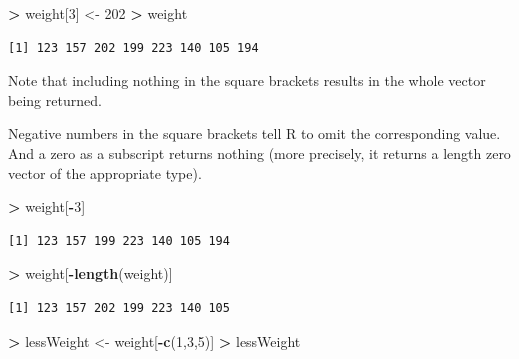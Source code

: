 \documentclass[]{krantz}
\makeatletter
\newenvironment{Shaded}{\begin{snugshade}}{\end{snugshade}}
\newcommand{\KeywordTok}[1]{\textcolor[rgb]{0.27,0.27,0.27}{\textbf{#1}}}
\newcommand{\DecValTok}[1]{\textcolor[rgb]{0.06,0.06,0.06}{#1}}
\newcommand{\StringTok}[1]{\textcolor[rgb]{0.5,0.5,0.5}{#1}}
\newcommand{\OperatorTok}[1]{\textcolor[rgb]{0.43,0.43,0.43}{\textbf{#1}}}
\newcommand{\NormalTok}[1]{#1}
\newenvironment{kframe}{%
\medskip{}
\setlength{\fboxsep}{.8em}
 \def\at@end@of@kframe{}%
 \ifinner\ifhmode%
  \def\at@end@of@kframe{\end{minipage}}%
  \begin{minipage}{\columnwidth}%
 \fi\fi%
 \def\FrameCommand##1{\hskip\@totalleftmargin \hskip-\fboxsep
 \colorbox{shadecolor}{##1}\hskip-\fboxsep
     \hskip-\linewidth \hskip-\@totalleftmargin \hskip\columnwidth}%
 \MakeFramed {\advance\hsize-\width
   \@totalleftmargin\z@ \linewidth\hsize
   \@setminipage}}%
 {\par\unskip\endMakeFramed%
 \at@end@of@kframe}
\renewenvironment{Shaded}{\begin{kframe}}{\end{kframe}}
\makeatother
\begin{document}
\begin{Shaded}
\begin{Highlighting}[]
\OperatorTok{>}\StringTok{ }\NormalTok{weight[}\DecValTok{3}\NormalTok{] <-}\StringTok{ }\DecValTok{202}
\OperatorTok{>}\StringTok{ }\NormalTok{weight}
\end{Highlighting}
\end{Shaded}

\begin{verbatim}
[1] 123 157 202 199 223 140 105 194
\end{verbatim}

Note that including nothing in the square brackets results in the whole
vector being returned.

Negative numbers in the square brackets tell R to omit the corresponding
value. And a zero as a subscript returns nothing (more precisely, it
returns a length zero vector of the appropriate type).

\begin{Shaded}
\begin{Highlighting}[]
\OperatorTok{>}\StringTok{ }\NormalTok{weight[}\OperatorTok{-}\DecValTok{3}\NormalTok{]}
\end{Highlighting}
\end{Shaded}

\begin{verbatim}
[1] 123 157 199 223 140 105 194
\end{verbatim}

\begin{Shaded}
\begin{Highlighting}[]
\OperatorTok{>}\StringTok{ }\NormalTok{weight[}\OperatorTok{-}\KeywordTok{length}\NormalTok{(weight)]}
\end{Highlighting}
\end{Shaded}

\begin{verbatim}
[1] 123 157 202 199 223 140 105
\end{verbatim}

\begin{Shaded}
\begin{Highlighting}[]
\OperatorTok{>}\StringTok{ }\NormalTok{lessWeight <-}\StringTok{ }\NormalTok{weight[}\OperatorTok{-}\KeywordTok{c}\NormalTok{(}\DecValTok{1}\NormalTok{,}\DecValTok{3}\NormalTok{,}\DecValTok{5}\NormalTok{)]}
\OperatorTok{>}\StringTok{ }\NormalTok{lessWeight}
\end{Highlighting}
\end{Shaded}
\end{document}
